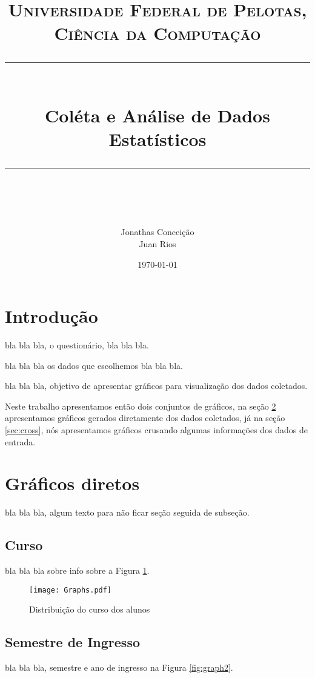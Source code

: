 \documentclass[11pt]{scrartcl} %
\title{
  \normalfont\normalsize
  \textsc{Universidade Federal de Pelotas, Ciência da Computação}\\ %
  \vspace{25pt} %
  \rule{\linewidth}{0.5pt}\\ %
  \vspace{20pt} %
  {\huge Coléta e Análise de Dados Estatísticos}\\ %
  \vspace{12pt} %
  \rule{\linewidth}{2pt}\\ %
  \vspace{12pt} %
}
\author{
  \LARGE Jonathas Conceição\\
  \LARGE Juan Rios
}
\date{\normalsize\today} %
\begin{document}
\maketitle %


\section{Introdução}

bla bla bla, o questionário, bla bla bla.

bla bla bla os dados que escolhemos bla bla bla.

bla bla bla, objetivo de apresentar gráficos para visualização dos dados coletados.


Neste trabalho apresentamos então dois conjuntos de gráficos,
na seção \ref{sec:raw} apresentamos gráficos gerados diretamente dos dados coletados,
já na seção \ref{sec:cross}, nós apresentamos gráficos crusando algumas informações dos dados de entrada.


\section{Gráficos diretos}\label{sec:raw}

bla bla bla, algum texto para não ficar seção seguida de subseção.

\subsection{Curso}

bla bla bla sobre info sobre a Figura \ref{fig:graph1}.

\begin{figure}[h]
  \centering
  \texttt{[image: Graphs.pdf]}
  \label{fig:graph1}
  \caption{Distribuição do curso dos alunos}
\end{figure}

\subsection{Semestre de Ingresso}

bla bla bla, semestre e ano de ingresso na Figura \ref{fig:graph2}.
\end{document}
